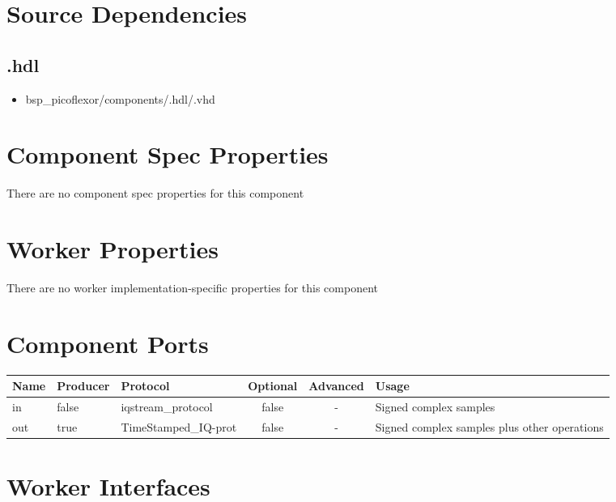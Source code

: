 \section*{Source Dependencies}
\subsection*{\comp.hdl}
\begin{itemize}
	\item bsp\_picoflexor/components/\comp.hdl/\comp.vhd
\end{itemize}

\begin{landscape}
	\section*{Component Spec Properties}
	There are no component spec properties for this component

	\section*{Worker Properties}
	There are no worker implementation-specific properties for this component

	\section*{Component Ports}
	\begin{scriptsize}
		\begin{tabular}{|M{2cm}|M{1.5cm}|M{4cm}|c|c|M{9cm}|}
			\hline
			Name & Producer & Protocol                       & Optional & Advanced & Usage                                  		\\
			\hline
			in   & false    & iqstream\_protocol			 & false    & -        & Signed complex samples 						\\
			\hline
			out  & true     & TimeStamped\_IQ-prot           & false    & -        & Signed complex samples plus other operations   \\
			\hline
		\end{tabular}
	\end{scriptsize}
	\section*{Worker Interfaces}

\end{landscape}
